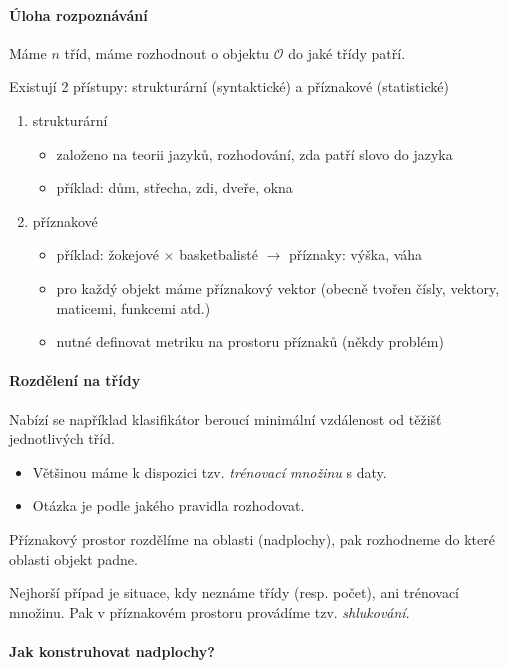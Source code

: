 \paragraph{Úloha rozpoznávání}
Máme $n$ tříd, máme rozhodnout o objektu $\mathcal{O}$ do jaké třídy patří.

Existují 2 přístupy: strukturární (syntaktické) a  příznakové (statistické)
\begin{enumerate}
\item strukturární
\begin{itemize}
\item založeno na teorii jazyků, rozhodování, zda patří slovo do jazyka
\item příklad: dům, střecha, zdi, dveře, okna
\end{itemize}
\item příznakové
\begin{itemize}
\item příklad: žokejové $\times$ basketbalisté $\rightarrow$ příznaky: výška, váha
\item pro každý objekt máme příznakový vektor (obecně tvořen čísly, vektory, maticemi, funkcemi atd.)
\item nutné definovat metriku na prostoru příznaků (někdy problém)
\end{itemize}
\end{enumerate}

\paragraph{Rozdělení na třídy}

Nabízí se například klasifikátor beroucí minimální vzdálenost od těžišť jednotlivých tříd.

\begin{itemize}
\item Většinou máme k dispozici tzv. {\em trénovací množinu} s daty.
\item Otázka je podle jakého pravidla rozhodovat.
\end{itemize}
Příznakový prostor rozdělíme na oblasti (nadplochy), pak rozhodneme do které oblasti objekt padne.

Nejhorší případ je situace, kdy neznáme třídy (resp. počet), ani trénovací množinu. Pak v příznakovém prostoru
provádíme tzv. {\em shlukování}.

\paragraph{Jak konstruhovat nadplochy?}

